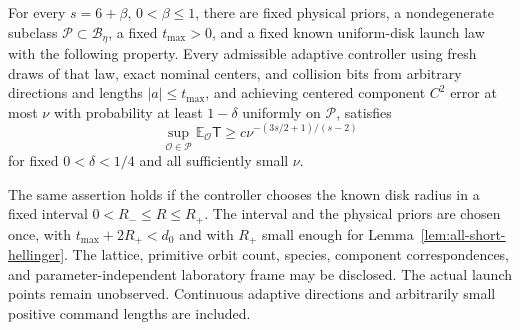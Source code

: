 \begin{theorem}
\label{thm:sharp-stationary-lower}
For every $s=6+\beta$, $0<\beta\le1$, there are fixed physical
priors, a nondegenerate subclass $\mathcal P\subset\mathcal B_\eta$,
a fixed $t_{\max}>0$, and a fixed known uniform-disk launch law
with the following property. Every admissible adaptive controller using
fresh draws of that law, exact nominal centers, and collision bits from
arbitrary directions and lengths $|a|\le t_{\max}$, and achieving
centered component $C^2$ error at most $\nu$ with probability at least
$1-\delta$ uniformly on $\mathcal P$, satisfies
\begin{equation}\label{eq:sharp-stationary-lower}
 \sup_{\mathcal O\in\mathcal P}\mathbb E_{\mathcal O}\mathsf T
                  \ge c\nu^{-(3s/2+1)/(s-2)}
\end{equation}
for fixed $0<\delta<1/4$ and all sufficiently small $\nu$.

The same assertion holds if the controller chooses the known disk
radius in a fixed interval $0<R_-\le R\le R_+$. The interval and
the physical priors are chosen once, with
$t_{\max}+2R_+<d_0$ and with $R_+$ small enough for
Lemma~\ref{lem:all-short-hellinger}. The lattice, primitive orbit
count, species, component correspondences, and parameter-independent
laboratory frame may be disclosed. The actual launch points remain
unobserved. Continuous adaptive directions and arbitrarily small
positive command lengths are included.
\end{theorem}
